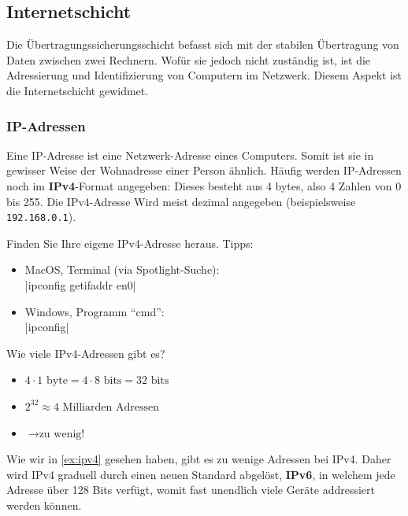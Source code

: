\subsection{Internetschicht}
Die Übertragungssicherungsschicht befasst sich mit der stabilen Übertragung von Daten zwischen zwei Rechnern. Wofür sie jedoch nicht zuständig ist, ist die Adressierung und Identifizierung von Computern im Netzwerk. Diesem Aspekt ist die Internetschicht gewidmet.

\subsubsection{IP-Adressen}

Eine \acrfull{IP}-Adresse ist eine Netzwerk-Adresse eines Computers. Somit ist sie in gewisser Weise der Wohnadresse einer Person ähnlich. Häufig werden IP-Adressen noch im \textbf{IPv4}-Format angegeben: Dieses besteht aus 4 bytes, also 4 Zahlen von 0 bis 255. Die IPv4-Adresse Wird meist dezimal angegeben (beispielsweise \texttt{192.168.0.1}).
\begin{myexercise}
	Finden Sie Ihre eigene IPv4-Adresse heraus. Tipps:
	\begin{itemize}
		\item MacOS, Terminal (via Spotlight-Suche): \\
		      \commandbox|ipconfig getifaddr en0|
		\item Windows, Programm ``cmd'': \\
		      \commandbox|ipconfig|
	\end{itemize}
\end{myexercise}
\begin{myexercise}\label{ex:ipv4}
	Wie viele IPv4-Adressen gibt es?
	\begin{myanswer}
		\begin{itemize}
			\item $4\cdot 1 \text{ byte} = 4\cdot 8 \text{ bits} = 32 \text{ bits}$
			\item $2^{32} \approx 4 \text{ Milliarden Adressen}$
			\item $\rightarrow \text{zu wenig!}$
		\end{itemize}
	\end{myanswer}
\end{myexercise}
Wie wir in \cref{ex:ipv4} gesehen haben, gibt es zu wenige Adressen bei IPv4. Daher wird IPv4 graduell durch einen neuen Standard abgelöst, \textbf{IPv6}, in welchem jede Adresse über 128 Bits verfügt, womit fast unendlich viele Geräte addressiert werden können.

